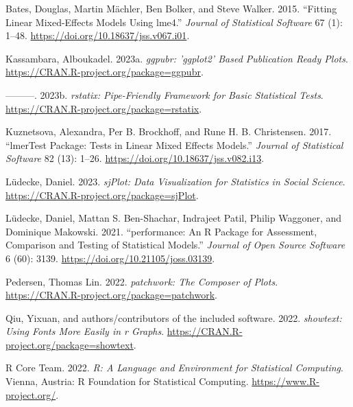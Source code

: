 \documentclass[
  letterpaper,
  DIV=11,
  numbers=noendperiod]{scrartcl}
\newlength{\cslhangindent}
\newlength{\cslentryspacingunit} %
\newenvironment{CSLReferences}[2] %
 {%
  \setlength{\parindent}{0pt}
  \ifodd #1
  \let\oldpar\par
  \def\par{\hangindent=\cslhangindent\oldpar}
  \fi
  \setlength{\parskip}{#2\cslentryspacingunit}
 }%
 {}
\begin{document}
\hypertarget{refs}{}
\begin{CSLReferences}{1}{0}
\leavevmode{}%
Bates, Douglas, Martin Mächler, Ben Bolker, and Steve Walker. 2015.
{``Fitting Linear Mixed-Effects Models Using {lme4}.''} \emph{Journal of
Statistical Software} 67 (1): 1--48.
\url{https://doi.org/10.18637/jss.v067.i01}.

\leavevmode{}%
Kassambara, Alboukadel. 2023a. \emph{{ggpubr}: '{ggplot2}' Based
Publication Ready Plots}.
\url{https://CRAN.R-project.org/package=ggpubr}.

\leavevmode{}%
---------. 2023b. \emph{{rstatix}: Pipe-Friendly Framework for Basic
Statistical Tests}. \url{https://CRAN.R-project.org/package=rstatix}.

\leavevmode{}%
Kuznetsova, Alexandra, Per B. Brockhoff, and Rune H. B. Christensen.
2017. {``{lmerTest} Package: Tests in Linear Mixed Effects Models.''}
\emph{Journal of Statistical Software} 82 (13): 1--26.
\url{https://doi.org/10.18637/jss.v082.i13}.

\leavevmode{}%
Lüdecke, Daniel. 2023. \emph{{sjPlot}: Data Visualization for Statistics
in Social Science}. \url{https://CRAN.R-project.org/package=sjPlot}.

\leavevmode{}%
Lüdecke, Daniel, Mattan S. Ben-Shachar, Indrajeet Patil, Philip
Waggoner, and Dominique Makowski. 2021. {``{performance}: An {R} Package
for Assessment, Comparison and Testing of Statistical Models.''}
\emph{Journal of Open Source Software} 6 (60): 3139.
\url{https://doi.org/10.21105/joss.03139}.

\leavevmode{}%
Pedersen, Thomas Lin. 2022. \emph{{patchwork}: The Composer of Plots}.
\url{https://CRAN.R-project.org/package=patchwork}.

\leavevmode{}%
Qiu, Yixuan, and authors/contributors of the included software. 2022.
\emph{{showtext}: Using Fonts More Easily in r Graphs}.
\url{https://CRAN.R-project.org/package=showtext}.

\leavevmode{}%
R Core Team. 2022. \emph{R: A Language and Environment for Statistical
Computing}. Vienna, Austria: R Foundation for Statistical Computing.
\url{https://www.R-project.org/}.


\end{CSLReferences}
\end{document}

